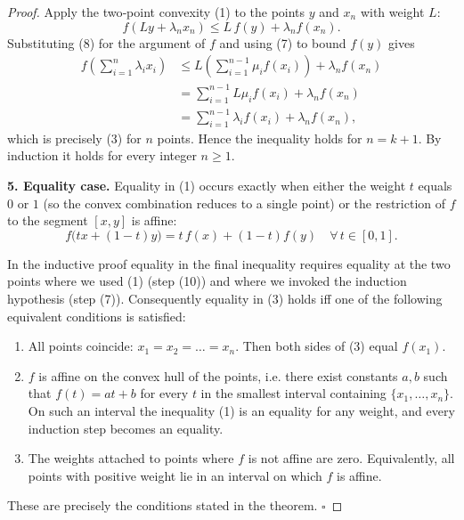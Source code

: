 \begin{proof}
Apply the two‑point convexity (1) to the points \(y\) and \(x_{n}\) with
weight \(L\):
\[
f(Ly+\lambda_{n}x_{n})\le L\,f(y)+\lambda_{n}f(x_{n}). \tag{10}
\]
Substituting (8) for the argument of \(f\) and using (7) to bound \(f(y)\)
gives
\begin{align*}
f\!\left(\sum_{i=1}^{n}\lambda_{i}x_{i}\right)
   &\le L\!\left(\sum_{i=1}^{n-1}\mu_{i}f(x_{i})\right)+\lambda_{n}f(x_{n}) \\
   &=\sum_{i=1}^{n-1}L\mu_{i}f(x_{i})+\lambda_{n}f(x_{n}) \\
   &=\sum_{i=1}^{n-1}\lambda_{i}f(x_{i})+\lambda_{n}f(x_{n}),
\end{align*}
which is precisely (3) for \(n\) points.  Hence the inequality holds for
\(n=k+1\).  By induction it holds for every integer \(n\ge1\).

\medskip\noindent\textbf{5. Equality case.}
Equality in (1) occurs exactly when either the weight \(t\) equals \(0\) or
\(1\) (so the convex combination reduces to a single point) or the
restriction of \(f\) to the segment \([x,y]\) is affine:
\[
f\bigl(t x+(1-t)y\bigr)=t\,f(x)+(1-t)f(y)\quad\forall\,t\in[0,1].
\]

In the inductive proof equality in the final inequality requires equality
at the two points where we used (1) (step (10)) and where we invoked the
induction hypothesis (step (7)).  Consequently equality in (3) holds
iff one of the following equivalent conditions is satisfied:

\begin{enumerate}
\item All points coincide: \(x_{1}=x_{2}=\dots =x_{n}\).  Then both sides of
(3) equal \(f(x_{1})\).
\item \(f\) is affine on the convex hull of the points, i.e. there exist
constants \(a,b\) such that \(f(t)=a t+b\) for every \(t\) in the smallest
interval containing \(\{x_{1},\dots ,x_{n}\}\).  On such an interval the
inequality (1) is an equality for any weight, and every induction step
becomes an equality.
\item The weights attached to points where \(f\) is not affine are zero.
Equivalently, all points with positive weight lie in an interval on which
\(f\) is affine.
\end{enumerate}
These are precisely the conditions stated in the theorem. \(\square\)
\end{proof}